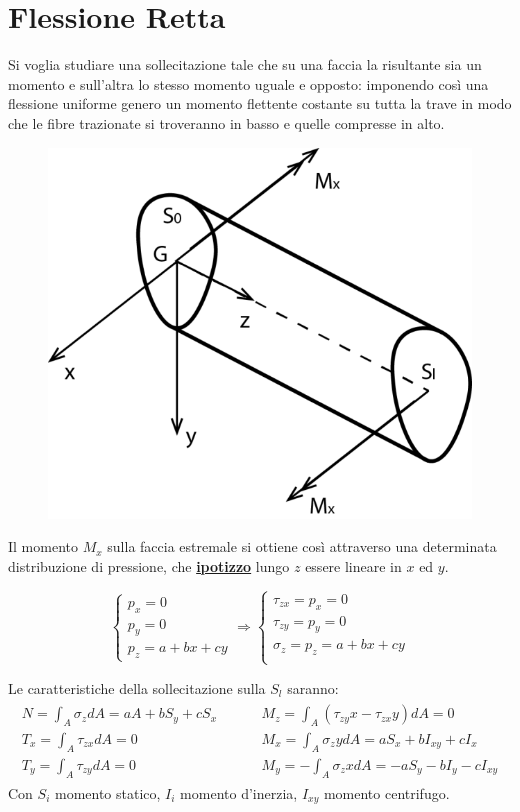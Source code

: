 
	
\section{Flessione Retta}
		Si voglia studiare una sollecitazione tale che su una faccia la risultante sia un momento e sull'altra lo stesso momento uguale e opposto: imponendo così una flessione uniforme genero un momento flettente costante su tutta la trave in modo che le fibre trazionate si troveranno in basso e quelle compresse in alto. 
		
\begin{figure}[H]
	\centering
	\includegraphics[width=0.5\linewidth]{Immagini_3/screenshot001}
	\label{fig:screenshot001}
\end{figure}


		Il momento $M_x$ sulla faccia estremale si ottiene così attraverso una determinata distribuzione di pressione, che \underline{\textbf{ipotizzo}} lungo $z$ essere lineare in $ x $ ed $ y $. 
		
		\[\begin{cases}
			p_x = 0 \\
			p_y = 0 \\
			p_z = a + bx + cy\end{cases} \Rightarrow \begin{cases}
			\tau_{zx} = p_x = 0 \\
			\tau_{zy} = p_y = 0 \\
			\sigma_z = p_z =  a + bx + cy  \\
		\end{cases}  \] 

		Le caratteristiche della sollecitazione sulla $S_l$ saranno:
		\[\begin{matrix}
			\begin{aligned}
				N = \int_A \sigma_zdA = aA + bS_y + cS_x  \hspace{1cm} & M_z = \int_A (\tau_{zy}x -\tau_{zx}y)dA = 0 \\
				T_x = \int_A \tau_{zx}dA = 0 \hspace{1cm} & M_x = \int_A \sigma_zydA = aS_x + bI_{xy} + cI_x \\
				T_y = \int_A \tau_{zy}dA = 0 \hspace{1cm} & M_y = -\int_A \sigma_zxdA = -aS_y - bI_y - cI_{xy}
			\end{aligned}	
		\end{matrix}\]
		Con $S_i$ momento statico, $I_i$ momento d'inerzia, $I_{xy}$ momento centrifugo.
		
